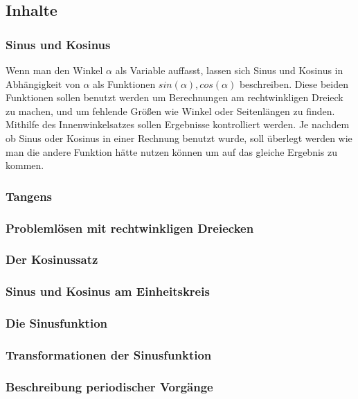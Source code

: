 \documentclass{article}
\begin{document}
\subsection{Inhalte}
\subsubsection*{Sinus und Kosinus}
Wenn man den Winkel $\alpha$ als Variable auffasst, lassen sich Sinus und Kosinus in Abhängigkeit von $\alpha$ als Funktionen $sin(\alpha), cos(\alpha)$ beschreiben.
Diese beiden Funktionen sollen benutzt werden um Berechnungen am rechtwinkligen Dreieck zu machen, und um fehlende Größen wie Winkel oder Seitenlängen zu finden.
Mithilfe des Innenwinkelsatzes sollen Ergebnisse kontrolliert werden.
Je nachdem ob Sinus oder Kosinus in einer Rechnung benutzt wurde, soll überlegt werden wie man die andere Funktion hätte nutzen können um auf das gleiche Ergebnis zu kommen.
\subsubsection*{Tangens}

\subsubsection*{Problemlösen mit rechtwinkligen Dreiecken}
\subsubsection*{Der Kosinussatz}
\subsubsection*{Sinus und Kosinus am Einheitskreis}
\subsubsection*{Die Sinusfunktion}
\subsubsection*{Transformationen der Sinusfunktion}
\subsubsection*{Beschreibung periodischer Vorgänge}
\end{document}
